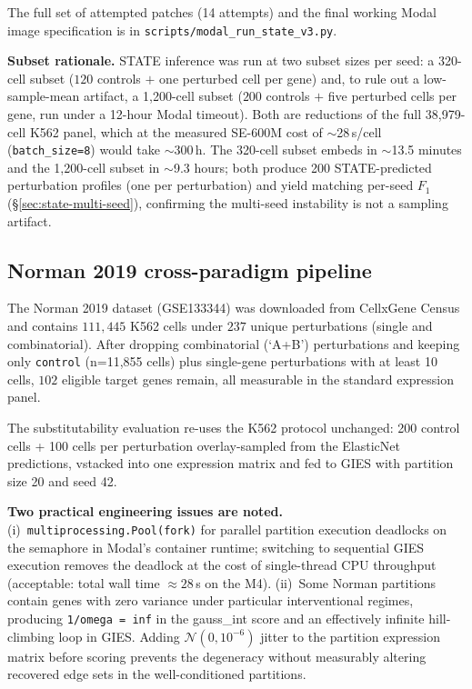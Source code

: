 \documentclass{article}
\theoremstyle{plain}
\theoremstyle{definition}
\theoremstyle{remark}
\begin{document}
The full set of attempted patches (14 attempts) and the final working Modal image specification is in \texttt{scripts/modal\_run\_state\_v3.py}.

\textbf{Subset rationale.} STATE inference was run at two subset sizes per seed: a 320-cell subset ($120$ controls $+$ one perturbed cell per gene) and, to rule out a low-sample-mean artifact, a 1{,}200-cell subset ($200$ controls $+$ five perturbed cells per gene, run under a 12-hour Modal timeout). Both are reductions of the full 38{,}979-cell K562 panel, which at the measured SE-600M cost of $\sim$28\,s/cell (\texttt{batch\_size=8}) would take $\sim$300\,h. The 320-cell subset embeds in $\sim$13.5 minutes and the 1{,}200-cell subset in $\sim$9.3 hours; both produce 200 STATE-predicted perturbation profiles (one per perturbation) and yield matching per-seed $F_1$ (\S\ref{sec:state-multi-seed}), confirming the multi-seed instability is not a sampling artifact.

\subsection{Norman 2019 cross-paradigm pipeline}
\label{app:norman_pipeline}

The Norman 2019 \citep{norman2019} dataset (GSE133344) was downloaded from CellxGene Census and contains $111{,}445$ K562 cells under $237$ unique perturbations (single and combinatorial). After dropping combinatorial (`A+B') perturbations and keeping only \texttt{control} (n=11{,}855 cells) plus single-gene perturbations with at least 10 cells, $102$ eligible target genes remain, all measurable in the standard expression panel.

The substitutability evaluation re-uses the K562 protocol unchanged: 200 control cells + 100 cells per perturbation overlay-sampled from the ElasticNet predictions, vstacked into one expression matrix and fed to GIES with partition size 20 and seed 42.

\textbf{Two practical engineering issues are noted.} (i)~\texttt{multiprocessing.Pool(fork)} for parallel partition execution deadlocks on the semaphore in Modal's container runtime; switching to sequential GIES execution removes the deadlock at the cost of single-thread CPU throughput (acceptable: total wall time ${\approx}28$\,s on the M4). (ii)~Some Norman partitions contain genes with zero variance under particular interventional regimes, producing \texttt{1/omega = inf} in the gauss\_int score and an effectively infinite hill-climbing loop in GIES. Adding $\mathcal{N}(0, 10^{-6})$ jitter to the partition expression matrix before scoring prevents the degeneracy without measurably altering recovered edge sets in the well-conditioned partitions.
\end{document}
